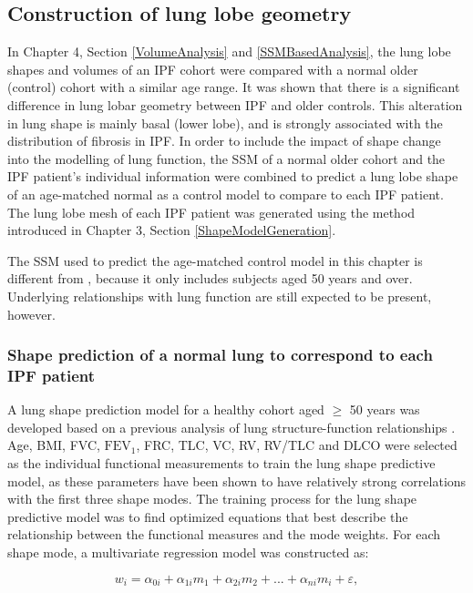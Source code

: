 \subsection{Construction of lung lobe geometry}
In Chapter 4, Section \ref{VolumeAnalysis} and \ref{SSMBasedAnalysis}, the lung lobe shapes and volumes of an IPF cohort were compared with a normal older (control) cohort with a similar age range. It was shown that there is a significant difference in lung lobar geometry between IPF and older controls. This alteration in lung shape is mainly basal (lower lobe), and is strongly associated with the distribution of fibrosis in IPF. In order to include the impact of shape change into the modelling of lung function, the SSM of a normal older cohort and the IPF patient's individual information were combined to predict a lung lobe shape of an age-matched normal as a control model to compare to each IPF patient. The lung lobe mesh of each IPF patient was generated using the method introduced in Chapter 3, Section \ref{ShapeModelGeneration}.

The SSM used to predict the age-matched control model in this chapter is different from \cite{Osanlouy2018Statistical}, because it only includes subjects aged 50 years and over. Underlying relationships with lung function are still expected to be present, however.

\subsubsection{Shape prediction of a normal lung to correspond to each IPF patient}
A lung shape prediction model for a healthy cohort aged $\geq$ 50 years was developed based on a previous analysis of lung structure-function relationships \citep{Osanlouy2018Statistical}. Age, BMI, FVC, $\mathrm{FEV_1}$, FRC, TLC, VC, RV, RV/TLC and DLCO were selected as the individual functional measurements to train the lung shape predictive model, as these parameters have been shown to have relatively strong correlations with the first three shape modes. The training process for the lung shape predictive model was to find optimized equations that best describe the relationship between the functional measures and the mode weights. For each shape mode, a multivariate regression model was constructed as:

\begin{equation}
 \label{eq:MultivariateRegression}
 w_i = \alpha_{0i} + \alpha_{1i}m_1 + \alpha_{2i}m_2 + ... + \alpha_{ni}m_i + \varepsilon,
\end{equation}

